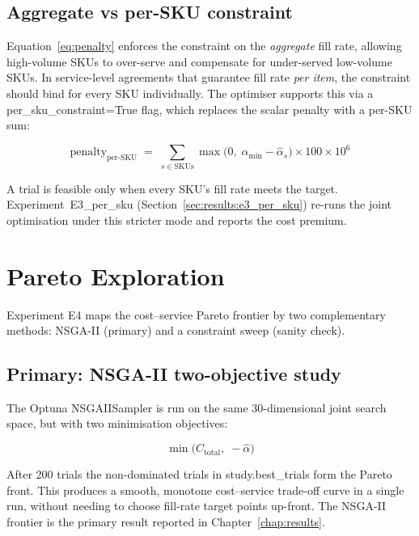 \subsection{Aggregate vs per-SKU constraint}
\label{sec:opt:per-sku}

Equation~\ref{eq:penalty} enforces the constraint on the
\emph{aggregate} fill rate, allowing high-volume SKUs to over-serve
and compensate for under-served low-volume SKUs.  In service-level
agreements that guarantee fill rate \emph{per item}, the constraint
should bind for every SKU individually.  The optimiser supports this
via a per\_sku\_constraint=True flag, which replaces the scalar
penalty with a per-SKU sum:

\begin{equation}
  \text{penalty}_{\text{per-SKU}} \;=\; \sum_{s \in \text{SKUs}}
        \max\!\bigl(0,\; \alpha_{\min} - \hat{\alpha}_s\bigr) \times 100 \times 10^6
  \label{eq:penalty-sku}
\end{equation}

A trial is feasible only when every SKU's fill rate meets the target.
Experiment~E3\_per\_sku (Section~\ref{sec:results:e3_per_sku}) re-runs the
joint optimisation under this stricter mode and reports the cost premium.

\section{Pareto Exploration}
\label{sec:opt:pareto}

Experiment E4 maps the cost--service Pareto frontier by two complementary methods: NSGA-II (primary) and a constraint sweep (sanity check).

\subsection{Primary: NSGA-II two-objective study}

The Optuna NSGAIISampler is run on the same
30-dimensional joint search space, but with two minimisation objectives:

\begin{equation}
  \min \bigl(C_{\text{total}},\; -\hat{\alpha}\bigr)
  \label{eq:nsga2-objective}
\end{equation}

After 200 trials the non-dominated trials in study.best\_trials
form the Pareto front.  This produces a smooth, monotone cost--service
trade-off curve in a single run, without needing to choose fill-rate
target points up-front.  The NSGA-II frontier is the primary result reported in Chapter~\ref{chap:results}.

